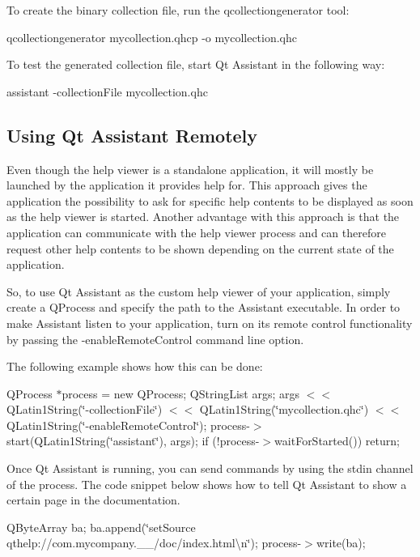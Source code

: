 To create the binary collection file, run the qcollectiongenerator tool\-: \begin{DoxyVerb}  qcollectiongenerator mycollection.qhcp -o mycollection.qhc
\end{DoxyVerb}


To test the generated collection file, start Qt Assistant in the following way\-: \begin{DoxyVerb}  assistant -collectionFile mycollection.qhc
\end{DoxyVerb}
\hypertarget{assistant_assistant_remote}{}\subsection{Using Qt Assistant Remotely}\label{assistant_assistant_remote}
Even though the help viewer is a standalone application, it will mostly be launched by the application it provides help for. This approach gives the application the possibility to ask for specific help contents to be displayed as soon as the help viewer is started. Another advantage with this approach is that the application can communicate with the help viewer process and can therefore request other help contents to be shown depending on the current state of the application.

So, to use Qt Assistant as the custom help viewer of your application, simply create a Q\-Process and specify the path to the Assistant executable. In order to make Assistant listen to your application, turn on its remote control functionality by passing the -\/enable\-Remote\-Control command line option.

The following example shows how this can be done\-:

Q\-Process $\ast$process = new Q\-Process; Q\-String\-List args; args $<$$<$ Q\-Latin1\-String(\char`\"{}-\/collection\-File\char`\"{}) $<$$<$ Q\-Latin1\-String(\char`\"{}mycollection.\-qhc\char`\"{}) $<$$<$ Q\-Latin1\-String(\char`\"{}-\/enable\-Remote\-Control\char`\"{}); process-\/$>$start(Q\-Latin1\-String(\char`\"{}assistant\char`\"{}), args); if (!process-\/$>$wait\-For\-Started()) return;

Once Qt Assistant is running, you can send commands by using the stdin channel of the process. The code snippet below shows how to tell Qt Assistant to show a certain page in the documentation.

Q\-Byte\-Array ba; ba.\-append(\char`\"{}set\-Source qthelp\-://com.\-mycompany.\-\_\-\_/doc/index.\-html\textbackslash{}n\char`\"{}); process-\/$>$write(ba);

